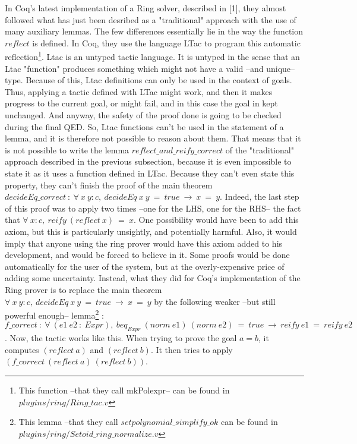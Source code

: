 In Coq's latest implementation of a Ring solver, described in [1], they almost followed what has just been desribed as a "traditional" approach with the use of many auxiliary lemmas. The few differences essentially lie in the way the function $reflect$ is defined. In Coq, they use the language LTac to program this automatic reflection\footnote{This function --that they call mkPolexpr-- can be found in $plugins/ring/Ring\_tac.v$}. Ltac is an untyped tactic language. It is untyped in the sense that an Ltac "function" produces something which might not have a valid  --and unique-- type. Because of this, Ltac definitions can only be used in the context of goals. Thus, applying a tactic defined with LTac might work, and then it makes progress to the current goal, or might fail, and in this case the goal in kept unchanged. And anyway, the safety of the proof done is going to be checked during the final QED. So, Ltac functions can't be used in the statement of a lemma, and it is therefore not possible to reason about them. That means that it is not possible to write the lemma $reflect\_and\_reify\_correct$ of the "traditional" approach described in the previous subsection, because it is even impossible to state it as it uses a function defined in LTac. Because they can't even state this property, they can't finish the proof of the main theorem $decideEq\_correct\ :\ \forall\  x\ y:c,\ decideEq\ x\ y\ =\ true\ \rightarrow\ x\ =\ y$. Indeed, the last step of this proof was to apply two times --one for the LHS, one for the RHS-- the fact that $\forall\ x:c,\ reify\ (reflect\ x)\ =\ x$. One possibility would have been to add this axiom, but this is particularly unsightly, and potentially harmful. Also, it would imply that anyone using the ring prover would have this axiom added to his development, and would be forced to believe in it. Some proofs would be done automatically for the user of the system, but at the overly-expensive price of adding some uncertainty.
Instead, what they did for Coq's implementation of the Ring prover is to replace the main theorem $\forall\  x\ y:c,\ decideEq\ x\ y\ =\ true\ \rightarrow\ x\ =\ y$ by the following weaker --but still powerful enough-- lemma\footnote{This lemma --that they call $setpolynomial\_simplify\_ok$ can be found in $plugins/ring/Setoid\_ring\_normalize.v$}  : $f\_correct\ :\ \forall\ (e1\ e2\ :\ Expr),\ beq_{Expr}\ (norm\ e1)\ (norm\ e2)\ =\ true\ \rightarrow\ reify\ e1\ =\ reify\ e2$.
Now, the tactic works like this. When trying to prove the goal $a=b$, it computes $(reflect\ a)$ and $(reflect\ b)$. It then tries to apply $(f\_correct\ (reflect\ a)\ (reflect\ b))$. 
